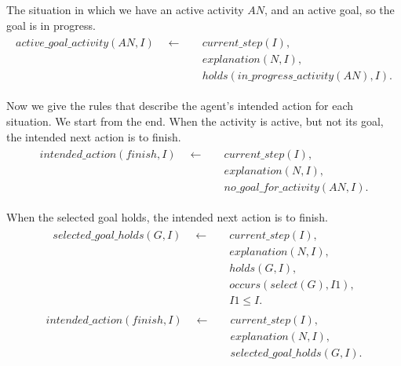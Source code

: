 \documentclass[11pt, oneside]{article}
\begin{document}
The situation in which we have an active activity $AN$, and an active goal, so the goal is in progress.
\begin{align}\begin{split}
active\_goal\_activity(AN,I)\quad \leftarrow \quad &current\_step(I),\\
&explanation(N,I),\\
&holds(in\_progress\_activity(AN),I).
\end{split}\end{align}


Now we give the rules that describe the agent's intended action for each situation. We start from the end. When the activity is active, but not its goal, the intended next action is to finish.
\begin{align}\begin{split}
intended\_action(finish,I)\quad \leftarrow \quad &current\_step(I),\\
&explanation(N,I),\\
&no\_goal\_for\_activity(AN,I).
\end{split}\end{align}

When the selected goal holds, the intended next action is to finish.
\begin{align}\begin{split}
selected\_goal\_holds(G,I)\quad \leftarrow \quad &current\_step(I),\\
&explanation(N,I),\\
&holds(G,I),\\
&occurs(select(G),I1),\\
&I1 \leq I.
\end{split}\end{align}
\begin{align}\begin{split}
intended\_action(finish,I)\quad \leftarrow \quad &current\_step(I),\\
&explanation(N,I),\\
&selected\_goal\_holds(G,I).
\end{split}\end{align}
\end{document}
